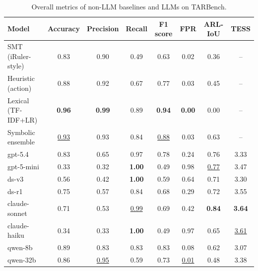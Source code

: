 \begin{table}[h]
\centering
\small
\setlength{\tabcolsep}{4pt}
\caption{Overall metrics of non-LLM baselines and LLMs on TARBench.}
\label{tab:mainresults}
\begin{tabular}{lccccccc}
\hline
Model & Accuracy & Precision & Recall & F1 score & FPR & ARL-IoU & TESS \\
\hline
SMT (iRuler-style) & 0.83 & 0.90 & 0.49 & 0.63 & 0.02 & 0.36 & -- \\
Heuristic (action) & 0.88 & 0.92 & 0.67 & 0.77 & 0.03 & 0.45 & -- \\
Lexical (TF-IDF+LR) & \textbf{0.96} & \textbf{0.99} & 0.89 & \textbf{0.94} & \textbf{0.00} & 0.00 & -- \\
Symbolic ensemble & \underline{0.93} & 0.93 & 0.84 & \underline{0.88} & 0.03 & 0.63 & -- \\
\hline
gpt-5.4 & 0.83 & 0.65 & 0.97 & 0.78 & 0.24 & 0.76 & 3.33 \\
gpt-5-mini & 0.33 & 0.32 & \textbf{1.00} & 0.49 & 0.98 & \underline{0.77} & 3.47 \\
ds-v3 & 0.56 & 0.42 & \textbf{1.00} & 0.59 & 0.64 & 0.71 & 3.30 \\
ds-r1 & 0.75 & 0.57 & 0.84 & 0.68 & 0.29 & 0.72 & 3.55 \\
claude-sonnet & 0.71 & 0.53 & \underline{0.99} & 0.69 & 0.42 & \textbf{0.84} & \textbf{3.64} \\
claude-haiku & 0.34 & 0.33 & \textbf{1.00} & 0.49 & 0.97 & 0.65 & \underline{3.61} \\
qwen-8b & 0.89 & 0.83 & 0.83 & 0.83 & 0.08 & 0.62 & 3.07 \\
qwen-32b & 0.86 & \underline{0.95} & 0.59 & 0.73 & \underline{0.01} & 0.48 & 3.38 \\
\hline
\end{tabular}
\end{table}
